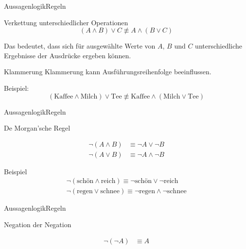 \documentclass[xelatex,aspectratio=169]{beamer}
\begin{document}
\begin{frame}{Aussagenlogik}{Regeln}
  \begin{block}{Verkettung unterschiedlicher Operationen}
    \[ (A \land B) \lor C \not\equiv A \land (B \lor C) \]

    Das bedeutet, dass sich für ausgewählte Werte von \(A\), \(B\) und \(C\) unterschiedliche Ergebnisse der Ausdrücke ergeben können.
  \end{block}
  \begin{block}{Klammerung}
    Klammerung kann Ausführungsreihenfolge beeinflussen.

    Beispiel:
    \[ (\mbox{Kaffee} \land \mbox{Milch}) \lor \mbox{Tee} \not\equiv \mbox{Kaffee} \land (\mbox{Milch} \lor \mbox{Tee}) \]
  \end{block}
\end{frame}

\begin{frame}{Aussagenlogik}{Regeln}
  \begin{block}{De Morgan'sche Regel}

    \begin{align*}
      \lnot (A \land B) & \equiv \lnot A \lor \lnot B  \\
      \lnot (A \lor B)  & \equiv \lnot A \land \lnot B
    \end{align*}
  \end{block}
  \begin{exampleblock}{Beispiel}
    \begin{align*}
      \lnot (\mbox{schön} \land \mbox{reich}) \equiv \lnot \mbox{schön} \lor \lnot \mbox{reich} \\
      \lnot (\mbox{regen} \lor \mbox{schnee}) \equiv \lnot \mbox{regen} \land \lnot \mbox{schnee}
    \end{align*}

  \end{exampleblock}
\end{frame}

\begin{frame}{Aussagenlogik}{Regeln}
  \begin{block}{Negation der Negation}

    \begin{align*}
      \lnot (\lnot A) & \equiv A
    \end{align*}
  \end{block}
\end{frame}
\end{document}
